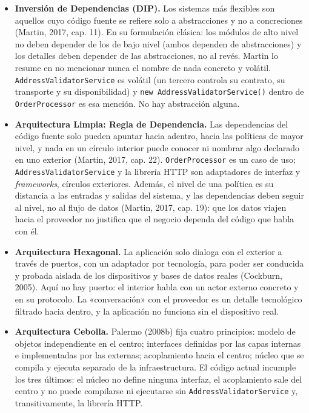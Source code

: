\documentclass[11pt,a4paper]{article}
\begin{document}
\begin{itemize}[leftmargin=1.4em]
\item \textbf{Inversión de Dependencias (DIP).} Los sistemas más flexibles son aquellos cuyo
código fuente se refiere solo a abstracciones y no a concreciones (Martin, 2017, cap. 11). En
su formulación clásica: los módulos de alto nivel no deben depender de los de bajo nivel
(ambos dependen de abstracciones) y los detalles deben depender de las abstracciones, no al
revés. Martin lo resume en no mencionar nunca el nombre de nada concreto y volátil.
\texttt{AddressValidatorService} es volátil (un tercero controla su contrato, su transporte y
su disponibilidad) y \texttt{new AddressValidatorService()} dentro de \texttt{OrderProcessor}
es esa mención. No hay abstracción alguna.
\item \textbf{Arquitectura Limpia: Regla de Dependencia.} Las dependencias del código fuente
solo pueden apuntar hacia adentro, hacia las políticas de mayor nivel, y nada en un círculo
interior puede conocer ni nombrar algo declarado en uno exterior (Martin, 2017, cap. 22).
\texttt{OrderProcessor} es un caso de uso; \texttt{AddressValidatorService} y la librería HTTP
son adaptadores de interfaz y \emph{frameworks}, círculos exteriores. Además, el nivel de una
política es su distancia a las entradas y salidas del sistema, y las dependencias deben seguir
al nivel, no al flujo de datos (Martin, 2017, cap. 19): que los datos viajen hacia el
proveedor no justifica que el negocio dependa del código que habla con él.
\item \textbf{Arquitectura Hexagonal.} La aplicación solo dialoga con el exterior a través de
puertos, con un adaptador por tecnología, para poder ser conducida y probada aislada de los
dispositivos y bases de datos reales (Cockburn, 2005). Aquí no hay puerto: el interior habla
con un actor externo concreto y en su protocolo. La «conversación» con el proveedor es un
detalle tecnológico filtrado hacia dentro, y la aplicación no funciona sin el dispositivo real.
\item \textbf{Arquitectura Cebolla.} Palermo (2008b) fija cuatro principios: modelo de objetos
independiente en el centro; interfaces definidas por las capas internas e implementadas por
las externas; acoplamiento hacia el centro; núcleo que se compila y ejecuta separado de la
infraestructura. El código actual incumple los tres últimos: el núcleo no define ninguna
interfaz, el acoplamiento sale del centro y no puede compilarse ni ejecutarse sin
\texttt{AddressValidatorService} y, transitivamente, la librería HTTP.
\end{itemize}
\end{document}

